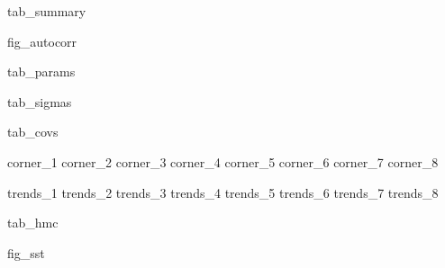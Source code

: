 \documentclass{aastex631}
\begin{document}
\pagestyle{fancy}

{{ tab_summary }}


{{ fig_autocorr }}


{{ tab_params }}


{{ tab_sigmas }}


{{ tab_covs }}


{{ corner_1 }}
{{ corner_2 }}
{{ corner_3 }}
{{ corner_4 }}
{{ corner_5 }}
{{ corner_6 }}
{{ corner_7 }}
{{ corner_8 }}


{{ trends_1 }}
{{ trends_2 }}
{{ trends_3 }}
{{ trends_4 }}
{{ trends_5 }}
{{ trends_6 }}
{{ trends_7 }}
{{ trends_8 }}


{{ tab_hmc }}


{{ fig_sst }}

\end{document}
